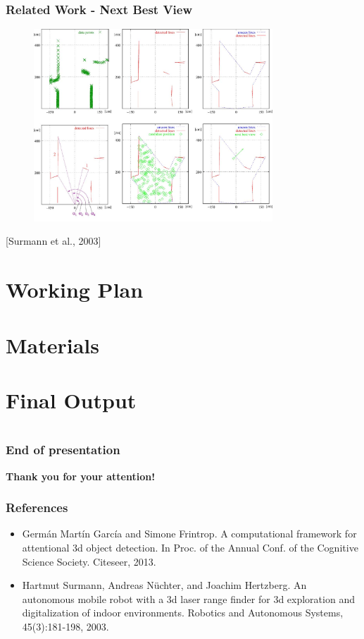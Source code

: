 \documentclass[t]{beamer} %
\begin{document}
\begin{frame}
	\frametitle{ Related Work - Next Best View}
	\begin{figure}[h]
		\includegraphics[width=0.8\textwidth]{src/nbv.png}
	\end{figure}
	\centering
	\scriptsize [Surmann et al., 2003]
\end{frame}

\section{Working Plan}


\section{Materials}


\section{Final Output}


\section*{} 
\begin{frame}
	\frametitle{ End of presentation }
	\vspace{1.5cm}
	\textbf{Thank you for your attention!}
\end{frame}

\begin{frame}
	\frametitle{ References }
	\begin{itemize}
		\item Germán Martín García and Simone Frintrop. A computational framework for attentional 3d object detection. In Proc. of the Annual Conf. of the Cognitive Science Society. Citeseer, 2013.	
		\item Hartmut Surmann, Andreas Nüchter, and Joachim Hertzberg. An autonomous mobile robot with a 3d laser range finder for 3d exploration and digitalization of indoor environments. Robotics and Autonomous Systems, 45(3):181-198, 2003.	
	\end{itemize} 
\end{frame}
\end{document}
